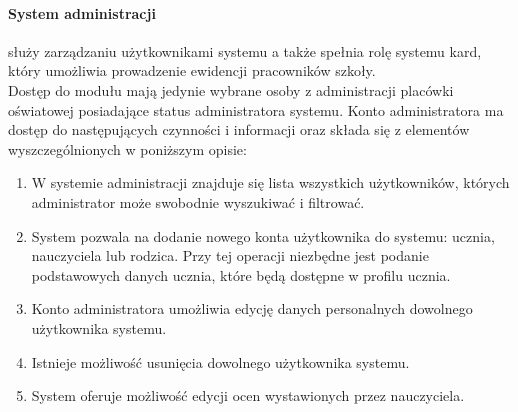 \documentclass{article}
\begin{document}
\paragraph{System administracji} służy zarządzaniu użytkownikami systemu a także spełnia rolę systemu kard, który umożliwia prowadzenie ewidencji pracowników szkoły.\\Dostęp do modułu mają jedynie wybrane osoby z administracji placówki oświatowej posiadające status administratora systemu. Konto administratora ma dostęp do następujących czynności i informacji oraz składa się z elementów wyszczególnionych w poniższym opisie:
\begin{enumerate}
\item W systemie administracji znajduje się lista wszystkich użytkowników, których administrator może swobodnie wyszukiwać i filtrować.
\item System pozwala na dodanie nowego konta użytkownika do systemu: ucznia, nauczyciela lub rodzica. Przy tej operacji niezbędne jest podanie podstawowych danych ucznia, które będą dostępne w profilu ucznia.
\item Konto administratora umożliwia edycję danych personalnych dowolnego użytkownika systemu.
\item Istnieje możliwość usunięcia dowolnego użytkownika systemu.
\item System oferuje możliwość edycji ocen wystawionych przez nauczyciela.


\end{enumerate}
\end{document}
